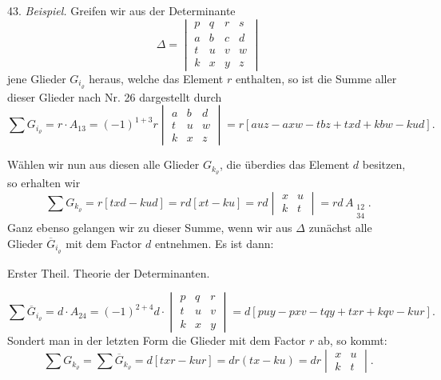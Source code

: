 \documentclass[11pt]{article}
\providecommand{\weberpage}[1]{}
\begin{document}
43. \textit{Beispiel.} Greifen wir aus der Determinante
\[
\varDelta = \begin{vmatrix} p & q & r & s\\ a & b & c & d\\ t & u & v & w\\ k & x & y & z \end{vmatrix}
\]
jene Glieder $G_{i_\varrho}$ heraus, welche das Element $r$ enthalten, so ist die Summe aller dieser Glieder nach Nr. 26 dargestellt durch
\[
\sum G_{i_\varrho} = r \cdot A_{13} = (-1)^{1+3} r \begin{vmatrix} a & b & d\\ t & u & w\\ k & x & z \end{vmatrix}
= r[auz - axw - tbz + txd + kbw - kud].
\]

Wählen wir nun aus diesen alle Glieder $G_{k_\varrho}$, die überdies das Element $d$ besitzen, so erhalten wir
\[
\sum G_{k_\varrho} = r[txd - kud] = rd[xt - ku] = rd \begin{vmatrix} x & u\\ k & t \end{vmatrix} = rd\, A_{\substack{12\\34}}.
\]
Ganz ebenso gelangen wir zu dieser Summe, wenn wir aus $\varDelta$ zunächst alle Glieder $\overline{G}_{i_\varrho}$ mit dem Factor $d$ entnehmen. Es ist dann:


\weberpage{50}
Erster Theil. Theorie der Determinanten.

\[
\sum \overline{G}_{i_\varrho} = d \cdot A_{24} = (-1)^{2+4} d \cdot \begin{vmatrix} p & q & r\\ t & u & v\\ k & x & y \end{vmatrix}
= d[puy - pxv - tqy + txr + kqv - kur].
\]
Sondert man in der letzten Form die Glieder mit dem Factor $r$ ab, so kommt:
\[
\sum G_{k_\varrho} = \sum \overline{G}_{k_\varrho} = d[txr - kur] = dr(tx - ku) = dr \begin{vmatrix} x & u\\ k & t \end{vmatrix}.
\]
\end{document}
